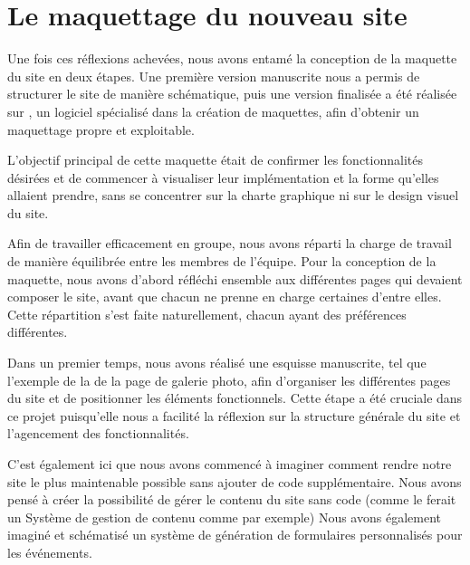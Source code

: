 \section{Le maquettage du nouveau site}

Une fois ces réflexions achevées, nous avons entamé la conception de la maquette du site en deux étapes. Une première version manuscrite nous a permis de structurer le site de manière schématique, puis une version finalisée a été réalisée sur , un logiciel spécialisé dans la création de maquettes, afin d’obtenir un maquettage propre et exploitable.

L'objectif principal de cette maquette était de confirmer les fonctionnalités désirées et de commencer à visualiser leur implémentation et la forme qu'elles allaient prendre, sans se concentrer sur la charte graphique ni sur le design visuel du site.
\bigskip

Afin de travailler efficacement en groupe, nous avons réparti la charge de travail de manière équilibrée entre les membres de l'équipe. Pour la conception de la maquette, nous avons d'abord réfléchi ensemble aux différentes pages qui devaient composer le site, avant que chacun ne prenne en charge certaines d’entre elles. Cette répartition s’est faite naturellement, chacun ayant des préférences différentes.
\bigskip

Dans un premier temps, nous avons réalisé une esquisse manuscrite, tel que l'exemple de la  de la page de galerie photo, afin d’organiser les différentes pages du site et de positionner les éléments fonctionnels. Cette étape a été cruciale dans ce projet puisqu'elle nous a facilité la réflexion sur la structure générale du site et l'agencement des fonctionnalités.

C'est également ici que nous avons commencé à imaginer comment rendre notre site le plus maintenable possible sans ajouter de code supplémentaire. Nous avons pensé à créer la possibilité de gérer le contenu du site sans code (comme le ferait un Système de gestion de contenu comme  par exemple)
Nous avons également imaginé et schématisé un système de génération de formulaires personnalisés pour les événements.

